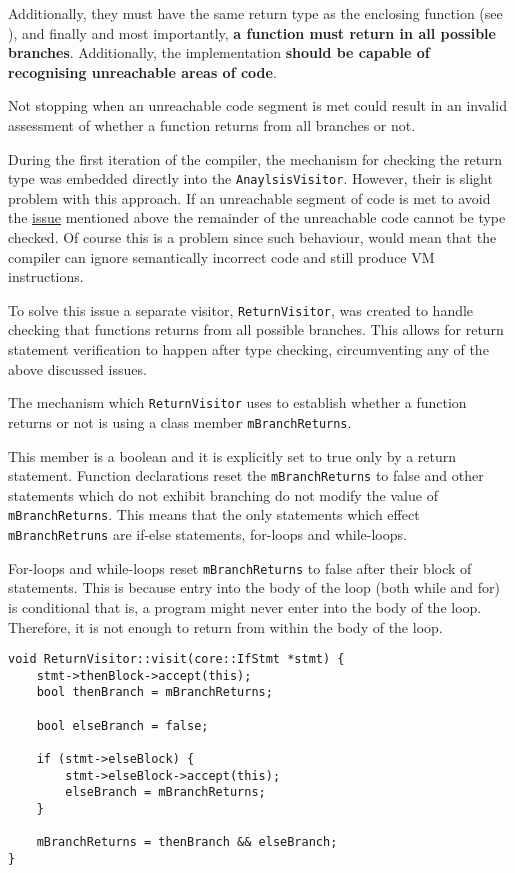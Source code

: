 Additionally, they must have the same return type as the
enclosing function (see ), and finally and
most importantly, \textbf{a function must return in all possible
branches}. Additionally, the implementation \textbf{should be
capable of recognising unreachable areas of code}.

\begin{marker}
\label{sss:returnissue} Not stopping when an unreachable code
segment is met could result in an invalid assessment of whether
a function returns from all branches or not.
\end{marker}

During the first iteration of the compiler, the mechanism for
checking the return type was embedded directly into the
\texttt{AnaylsisVisitor}. However, their is slight problem with
this approach. If an unreachable segment of code is met to avoid
the \hyperref[sss:returnissue]{issue} mentioned above the
remainder of the unreachable code cannot be type checked. Of
course this is a problem since such behaviour, would mean that
the compiler can ignore semantically incorrect code and still
produce VM instructions.

To solve this issue a separate visitor, \texttt{ReturnVisitor},
was created to handle checking that functions returns from all
possible branches. This allows for return statement verification
to  happen after type checking, circumventing any of the above
discussed issues.

The mechanism which \texttt{ReturnVisitor} uses to establish
whether a function returns or not is using a class member
\texttt{mBranchReturns}.

This member is a boolean and it is explicitly set to true only
by a return statement. Function declarations reset the
\texttt{mBranchReturns} to false and other statements which do
not exhibit branching do not modify the value of
\texttt{mBranchReturns}. This means that the only statements
which effect \texttt{mBranchRetruns} are if-else statements,
for-loops and while-loops.

For-loops and while-loops reset \texttt{mBranchReturns} to false
after their block of statements. This is because entry into the
body of the loop (both while and for) is conditional that is, a
program might never enter into the body of the loop. Therefore,
it is not enough to return from within the body of the loop.

\begin{lstlisting}[caption={The \texttt{visit(IfStmt *)} method
in the \texttt{ReturnVisitor} class
(analysis/ReturnVisitor.cpp).},label=lst:iftypecheck]
void ReturnVisitor::visit(core::IfStmt *stmt) {
    stmt->thenBlock->accept(this);
    bool thenBranch = mBranchReturns;

    bool elseBranch = false;

    if (stmt->elseBlock) {
        stmt->elseBlock->accept(this);
        elseBranch = mBranchReturns;
    }

    mBranchReturns = thenBranch && elseBranch;
}
\end{lstlisting}

